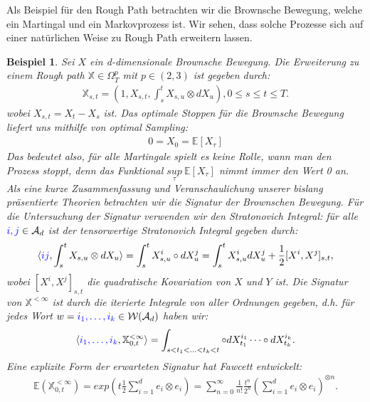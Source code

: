 \documentclass[12pt,titlepage,headsepline]{article}
\newtheorem{beispiel}[definition]{Beispiel}
\begin{document}
      Als Beispiel für den Rough Path betrachten wir die Brownsche Bewegung, welche ein Martingal und ein Markovprozess ist. Wir sehen, dass solche Prozesse sich auf einer natürlichen Weise zu Rough Path erweitern lassen.
      \begin{beispiel}\label{rough_path: brownian_motion}
        \textup{
        Sei $X$ ein d-dimensionale Brownsche Bewegung. Die Erweiterung zu einem Rough path $\mathbb{X} \in \Omega_T^p$ mit $p \in (2,3)$ ist gegeben durch:
        \begin{align*}
          \mathbb{X}_{s,t} = (1,X_{s,t},\int_s^t X_{s,u} \otimes dX_u), 0 \leq s \leq t \leq T.
        \end{align*}
        wobei $X_{s,t} = X_t - X_s$ ist.
        \hfill\break
        Das optimale Stoppen für die Brownsche Bewegung liefert uns mithilfe von optimal Sampling:
        \begin{align*}
          0 = X_0 = \mathbb{E}[X_{\tau}]
        \end{align*}
        Das bedeutet also, für alle Martingale spielt es keine Rolle, wann man den Prozess stoppt, denn das Funktional $\underset{\tau}{sup} \ \mathbb{E}[X_{\tau}]$ nimmt immer den Wert 0 an.
        \hfill\break
        Als eine kurze Zusammenfassung und Veranschaulichung unserer bislang präsentierte Theorien betrachten wir die Signatur der Brownschen Bewegung. Für die Untersuchung der Signatur verwenden wir den Stratonovich Integral: für alle $\textcolor{blue}{i,j} \in \mathcal{A}_d$ ist der tensorwertige Stratonovich Integral gegeben durch:
        \begin{align*}
          \langle \textcolor{blue}{ij}, \int_s^t X_{s,u} \otimes dX_u \rangle = \int_s^t X_{s,u}^i \circ dX_u^j = \int_s^t X_{s,u}^i dX_u^j + \frac{1}{2}[X^i,X^j]_{s,t},
        \end{align*}
        wobei $[X^i,X^j]_{s,t}$ die quadratische Kovariation von $X$ und $Y$ ist. Die Signatur von $\mathbb{X}^{<\infty}$ ist durch die iterierte Integrale von aller Ordnungen gegeben, d.h. für jedes Wort $w=\textcolor{blue}{i_1,\ldots,i_k} \in \mathcal{W}(\mathcal{A}_d)$ haben wir:
        \begin{align*}
          \langle \textcolor{blue}{i_1,\ldots,i_k}, \mathbb{X}^{<\infty}_{0,t} \rangle = \int_{s<t_1<\ldots<t_k<t}\circ dX^{i_1}_{t_1} \dotsm \circ dX^{i_k}_{t_k}.
        \end{align*}
        Eine explizite Form der erwarteten Signatur hat Fawcett \cite{fawcett2002problems} entwickelt:
        \begin{align*}
          \mathbb{E}(\mathbb{X}^{<\infty}_{0,t})=exp(t\frac{1}{2}\sum^d_{i=1}e_i\otimes e_i) = \sum_{n=0}^{\infty}\frac{1}{n!}\frac{t^n}{2^n}(\sum_{i=1}^d e_i \otimes e_i)^{\otimes n}.
        \end{align*}
        }
      \end{beispiel}
\end{document}
